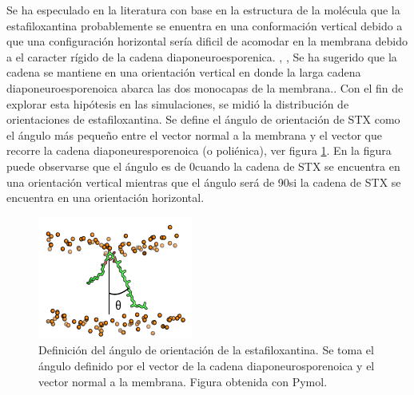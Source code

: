 Se ha especulado en la literatura con base en la estructura de la mol\'{e}cula que la estafiloxantina probablemente se enuentra en una conformaci\'{o}n vertical debido a que una configuraci\'{o}n horizontal ser\'{i}a dificil de acomodar en la membrana debido a el caracter r\'{i}gido de la cadena diaponeuroesporenica. \cite{Gruszecki2004CarotenoidsProperties}, \cite{Marquardt2016CholesterolsBilayers}, Se ha sugerido que la cadena se mantiene en una orientaci\'{o}n vertical en donde la larga cadena diaponeuroesporenoica abarca las dos monocapas de la membrana.. Con el fin de explorar esta hip\'{o}tesis en las simulaciones, se midi\'{o} la distribuci\'{o}n de orientaciones de estafiloxantina. Se define el \'{a}ngulo de orientaci\'{o}n de STX como el \'{a}ngulo m\'{a}s peque\~{n}o entre el vector normal a la membrana y el vector que recorre la cadena diaponeuresporenoica (o poli\'{e}nica), ver figura \ref{fig:stxangdef}. En la figura puede observarse que el \'{a}ngulo es de 0\textdegree  cuando la cadena de STX se encuentra en una orientaci\'{o}n vertical mientras que el \'{a}ngulo ser\'{a} de 90\textdegree  si  la cadena de STX se encuentra en una orientaci\'{o}n horizontal.\\
\begin{figure}[h]
\begin{center}
  \includegraphics[scale=1.4]{Plots/angle_1stx.pdf}
  \caption{Definici\'{o}n del \'{a}ngulo de orientaci\'{o}n de la estafiloxantina. Se toma el \'{a}ngulo definido por el vector de la cadena diaponeurosporenoica y el vector normal a la membrana. Figura obtenida con Pymol.}
  \label{fig:stxangdef}
\end{center}
\end{figure}
